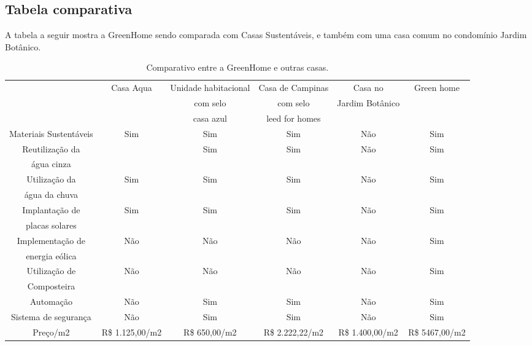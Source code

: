 \subsection{Tabela comparativa}	

	A tabela a seguir mostra a GreenHome sendo comparada com Casas Sustentáveis, e também com uma casa comum no condomínio Jardim Botânico. 

\begin{table}[H]
\centering

\begin{sideways}
\begin{tabular}{|c|c|c|c|c|c|}
\cline{2-6} 
\multicolumn{1}{c|}{} & \multirow{3}{*}{Casa Aqua} & Unidade habitacional & Casa de Campinas & Casa no  & \multirow{3}{*}{Green home}\tabularnewline
\multicolumn{1}{c|}{} &  & com selo & com selo & \multirow{2}{*}{Jardim Botânico} & \tabularnewline
\multicolumn{1}{c|}{} &  & casa azul & leed for homes &  & \tabularnewline
\hline 
Materiais Sustentáveis & Sim & Sim & Sim & Não & Sim\tabularnewline
\hline 
Reutilização da & \multirow{2}{*}{} & \multirow{2}{*}{Sim} & \multirow{2}{*}{Sim} & \multirow{2}{*}{Não} & \multirow{2}{*}{Sim}\tabularnewline
 água cinza &  &  &  &  & \tabularnewline
\hline 
Utilização da  & \multirow{2}{*}{Sim} & \multirow{2}{*}{Sim} & \multirow{2}{*}{Sim} & \multirow{2}{*}{Não} & \multirow{2}{*}{Sim}\tabularnewline
água da chuva &  &  &  &  & \tabularnewline
\hline 
Implantação de  & \multirow{2}{*}{Sim} & \multirow{2}{*}{Sim} & \multirow{2}{*}{Sim} & \multirow{2}{*}{Não} & \multirow{2}{*}{Sim}\tabularnewline
placas solares &  &  &  &  & \tabularnewline
\hline 
Implementação de & \multirow{2}{*}{Não} & \multirow{2}{*}{Não} & \multirow{2}{*}{Não} & \multirow{2}{*}{Não} & \multirow{2}{*}{Sim}\tabularnewline
 energia eólica &  &  &  &  & \tabularnewline
\hline 
Utilização de  & \multirow{2}{*}{Não} & \multirow{2}{*}{Não} & \multirow{2}{*}{Não} & \multirow{2}{*}{Não} & \multirow{2}{*}{Sim}\tabularnewline
Composteira &  &  &  &  & \tabularnewline
\hline 
Automação & Não & Sim & Sim & Não & Sim\tabularnewline
\hline 
Sistema de segurança & Não & Sim & Sim & Não & Sim\tabularnewline
\hline 
Preço/m2 & R\$ 1.125,00/m2 & R\$ 650,00/m2 & R\$ 2.222,22/m2 & R\$ 1.400,00/m2 & R\$ 5467,00/m2\tabularnewline
\hline 
\end{tabular}
\end{sideways}
\caption{Comparativo entre a GreenHome e outras casas.}
\end{table}